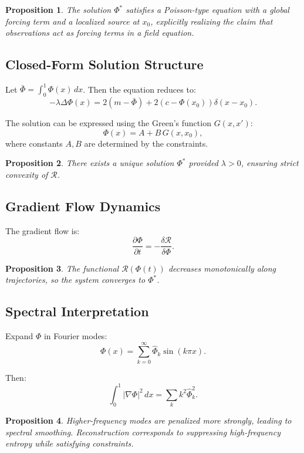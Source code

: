\documentclass[12pt]{article}
\newtheorem{proposition}{Proposition}
\begin{document}
\begin{proposition}
The solution $\Phi^*$ satisfies a Poisson-type equation with a global forcing term and a localized source at $x_0$, explicitly realizing the claim that observations act as forcing terms in a field equation.
\end{proposition}

\subsection{Closed-Form Solution Structure}

Let $\bar{\Phi} = \int_0^1 \Phi(x)\,dx$. Then the equation reduces to:
\[
- \lambda \Delta \Phi(x)
= 2(m - \bar{\Phi}) + 2(c - \Phi(x_0))\delta(x-x_0).
\]

The solution can be expressed using the Green's function $G(x,x')$:
\[
\Phi(x) = A + B\, G(x,x_0),
\]
where constants $A, B$ are determined by the constraints.

\begin{proposition}
There exists a unique solution $\Phi^*$ provided $\lambda > 0$, ensuring strict convexity of $\mathcal{R}$.
\end{proposition}

\subsection{Gradient Flow Dynamics}

The gradient flow is:
\[
\frac{\partial \Phi}{\partial t}
= - \frac{\delta \mathcal{R}}{\delta \Phi}.
\]

\begin{proposition}
The functional $\mathcal{R}(\Phi(t))$ decreases monotonically along trajectories, so the system converges to $\Phi^*$.
\end{proposition}

\subsection{Spectral Interpretation}

Expand $\Phi$ in Fourier modes:
\[
\Phi(x) = \sum_{k=0}^\infty \hat{\Phi}_k \sin(k\pi x).
\]

Then:
\[
\int_0^1 |\nabla \Phi|^2\, dx = \sum_k k^2 \hat{\Phi}_k^2.
\]

\begin{proposition}
Higher-frequency modes are penalized more strongly, leading to spectral smoothing. Reconstruction corresponds to suppressing high-frequency entropy while satisfying constraints.
\end{proposition}
\end{document}
